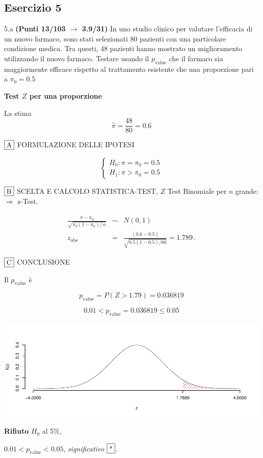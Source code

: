 \documentclass[
  11pt,
]{book}
\theoremstyle{mytheoremstyle}
\theoremstyle{mydefstyle}
\newenvironment{sol}
  {
  \begin{tcolorbox}[enhanced,breakable,arc=0.1mm,boxrule=1pt,colback=white,colframe=iblue,
  title=\bf \fontfamily{lmss}\selectfont \hspace{.5 cm} Soluzione,drop fuzzy shadow]

}{
\end{tcolorbox}
  }
\begin{document}
\subsection{Esercizio 5}\label{esercizio-5-30}

5.a \textbf{(Punti 13/103 \(\rightarrow\) 3.9/31)} In uno studio clinico per valutare l'efficacia di un nuovo farmaco, sono stati selezionati 80 pazienti con una particolare condizione medica. Tra questi, 48 pazienti hanno mostrato un miglioramento utilizzando il nuovo farmaco. Testare usando il \(p_\text{value}\) che il farmaco sia maggiormente efficace rispetto al trattamento esistente che una proporzione pari a \(\pi_0 = 0.5\)

\begin{sol}
\textbf{Test \(Z\) per una proporzione}

La stima
\[\hat\pi=\frac { 48 } { 80 }= 0.6  \]

\(\fbox{A}\) FORMULAZIONE DELLE IPOTESI

\[\begin{cases}
   H_0: \pi = \pi_0=0.5 \\
   H_1: \pi > \pi_0=0.5 
   \end{cases}\]

\(\fbox{B}\) SCELTA E CALCOLO STATISTICA-TEST, \(Z\)
Test Binomiale per \(n\) grande: \(\Rightarrow\) z-Test.

\begin{eqnarray*}
   \frac{\hat\pi - \pi_{0}} {\sqrt {\pi_0(1-\pi_0)/\,n}}&\sim&N(0,1)\\
   z_{\text{obs}}
   &=& \frac{ ( 0.6 -  0.5 )} {\sqrt{ 0.5 (1- 0.5 )/ 80 }}
   =   1.789 \,.
   \end{eqnarray*}

\(\fbox{C}\) CONCLUSIONE

Il \(p_{\text{value}}\) è

\[ p_{\text{value}} = P(Z>1.79)=0.036819 \]

\[
 0.01 < p_\text{value}= 0.036819 \leq 0.05 
\]

\begin{center}\includegraphics{Esami_passati_con_soluzioni_files/figure-latex/2023-95,-1} \end{center}

\textbf{Rifiuto} \(H_0\) al 5\%,

\(0.01<p_\text{value}<0.05\), \emph{significativo} \(\fbox{*}\).

\end{sol}
\end{document}
